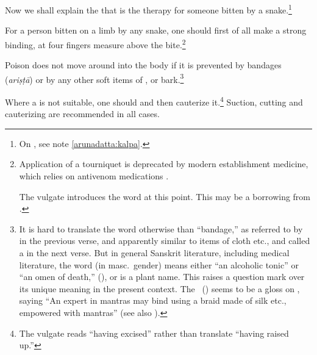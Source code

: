 \begin{translation}
    \item [1]
    Now we shall explain the  that is the therapy for 
    someone bitten by a snake.\footnote{On , see note 
    \ref{arunadatta:kalpa}.}
    

       
    \item[3] For a person bitten on a limb by any snake, one should first
of all make a strong binding, at four fingers measure above the
bite.\footnote{Application of a tourniquet is deprecated by modern
    establishment medicine, which relies on antivenom medications
    \citep[e.g.,][150--151 et passim in the literature]{pill-2013}.
    
    The vulgate introduces the word  at this point.  This may be a 
    borrowing from .}
    
    
    \item[4]
    
    Poison does not move around into the body if it is prevented by
bandages (\emph{ariṣṭā}) or by any other soft
items of ,  or
bark.\footnote{It is hard to translate the word 
    otherwise than “bandage,” as referred to by  in the
    previous verse, and apparently similar to items of cloth etc., and
    called a  in the next verse.  But in general Sanskrit
    literature, including medical literature, the word (in masc.\ gender)
    means either “an alcoholic tonic” or “an omen of death,”
    (), or is a plant name.  This raises a question mark
    over its unique meaning in the present context.  The \AH\
    () seems to be a gloss on , saying
    “An expert in mantras may bind using a braid made of silk etc.,
    empowered with mantras” (see also \Su{5.5.8}{575}).}
    
\item[5] Where a  is not suitable, one should
\diff{raise the bite up} and then cauterize it.\footnote{The vulgate
    reads \dev{utkṛtya} “having excised” rather than translate 
    “having raised up.”} Suction, cutting and cauterizing are recommended in
    all cases.


\end{translation}
